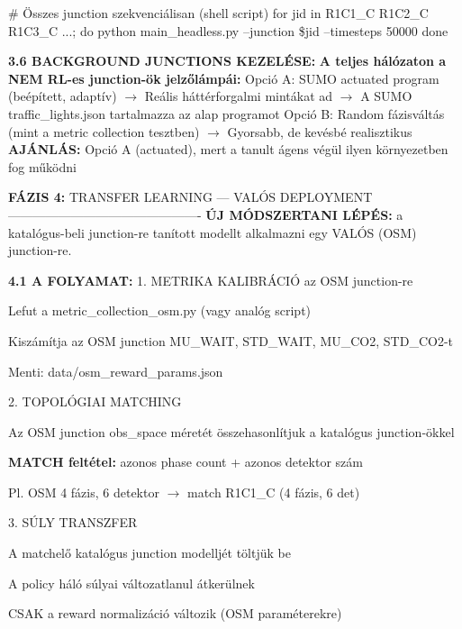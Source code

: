 \documentclass[11pt,a4paper]{article}
\begin{document}
\# Összes junction szekvenciálisan (shell script)
for jid in R1C1\_C R1C2\_C R1C3\_C ...; do
python main\_headless.py --junction \$jid --timesteps 50000
done

\textbf{3.6 BACKGROUND JUNCTIONS KEZELÉSE:}
\textbf{A teljes hálózaton a NEM RL-es junction-ök jelzőlámpái:}
Opció A: SUMO actuated program (beépített, adaptív)
$\rightarrow$ Reális háttérforgalmi mintákat ad
$\rightarrow$ A SUMO traffic\_lights.json tartalmazza az alap programot
Opció B: Random fázisváltás (mint a metric collection tesztben)
$\rightarrow$ Gyorsabb, de kevésbé realisztikus
\textbf{AJÁNLÁS:} Opció A (actuated), mert a tanult ágens végül
ilyen környezetben fog működni

\textbf{FÁZIS 4:} TRANSFER LEARNING — VALÓS DEPLOYMENT
----------------------------------------------
\textbf{ÚJ MÓDSZERTANI LÉPÉS:} a katalógus-beli junction-re tanított
modellt alkalmazni egy VALÓS (OSM) junction-re.

\textbf{4.1 A FOLYAMAT:}
1. METRIKA KALIBRÁCIÓ az OSM junction-re
\par\noindent\hspace*{1em}\textbullet{} Lefut a metric\_collection\_osm.py (vagy analóg script)
\par\noindent\hspace*{1em}\textbullet{} Kiszámítja az OSM junction MU\_WAIT, STD\_WAIT, MU\_CO2, STD\_CO2-t
\par\noindent\hspace*{1em}\textbullet{} Menti: data/osm\_reward\_params.json

2. TOPOLÓGIAI MATCHING
\par\noindent\hspace*{1em}\textbullet{} Az OSM junction obs\_space méretét összehasonlítjuk a
katalógus junction-ökkel
\par\noindent\hspace*{1em}\textbullet{} \textbf{MATCH feltétel:} azonos phase count + azonos detektor szám
\par\noindent\hspace*{1em}\textbullet{} Pl. OSM 4 fázis, 6 detektor $\rightarrow$ match R1C1\_C (4 fázis, 6 det)

3. SÚLY TRANSZFER
\par\noindent\hspace*{1em}\textbullet{} A matchelő katalógus junction modelljét töltjük be
\par\noindent\hspace*{1em}\textbullet{} A policy háló súlyai változatlanul átkerülnek
\par\noindent\hspace*{1em}\textbullet{} CSAK a reward normalizáció változik (OSM paraméterekre)
\end{document}
